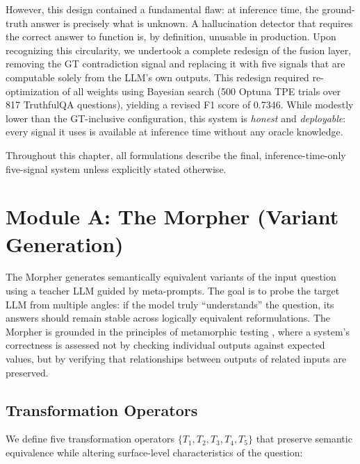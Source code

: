However, this design contained a fundamental flaw: at inference time, the ground-truth answer is precisely what is unknown. A hallucination detector that requires the correct answer to function is, by definition, unusable in production. Upon recognizing this circularity, we undertook a complete redesign of the fusion layer, removing the GT contradiction signal and replacing it with five signals that are computable solely from the LLM's own outputs. This redesign required re-optimization of all weights using Bayesian search (500 Optuna TPE trials over 817 TruthfulQA questions), yielding a revised F1 score of 0.7346. While modestly lower than the GT-inclusive configuration, this system is \emph{honest} and \emph{deployable}: every signal it uses is available at inference time without any oracle knowledge.

Throughout this chapter, all formulations describe the final, inference-time-only five-signal system unless explicitly stated otherwise.


\section{Module A: The Morpher (Variant Generation)}

The Morpher generates semantically equivalent variants of the input question using a teacher LLM guided by meta-prompts. The goal is to probe the target LLM from multiple angles: if the model truly ``understands'' the question, its answers should remain stable across logically equivalent reformulations. The Morpher is grounded in the principles of metamorphic testing \cite{chen2018metamorphic}, where a system's correctness is assessed not by checking individual outputs against expected values, but by verifying that relationships between outputs of related inputs are preserved.

\subsection{Transformation Operators}

We define five transformation operators $\{T_1, T_2, T_3, T_4, T_5\}$ that preserve semantic equivalence while altering surface-level characteristics of the question:

